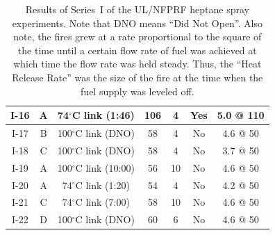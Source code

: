 \begin{table}[h!]
\begin{center}
\begin{tabular}{|c||c|c|c|c|c|c|}
I-16  & A  & 74$^\circ$C link (1:46)    & 106           & 4         & Yes  & 5.0 @ 110 \\ \hline \hline
I-17  & B  & 100$^\circ$C link (DNO)    & 58            & 4         & No   & 4.6 @ 50 \\ \hline
I-18  & C  & 100$^\circ$C link (DNO)    & 58            & 4         & No   & 3.7 @ 50 \\ \hline
I-19  & A  & 100$^\circ$C link (10:00)  & 56            & 10        & No   & 4.6 @ 50 \\ \hline
I-20  & A  & 74$^\circ$C link (1:20)    & 54            & 4         & No   & 4.2 @ 50 \\ \hline
I-21  & C  & 74$^\circ$C link (7:00)    & 58            & 10        & No   & 4.6 @ 50 \\ \hline
I-22  & D  & 100$^\circ$C link (DNO)    & 60            & 6         & No   & 4.6 @ 50 \\ \hline
\end{tabular}
\end{center}
\caption[Results of the UL/NFPRF heptane spray experiments, Series~I]
{Results of Series~I of the UL/NFPRF heptane spray experiments. Note that DNO means ``Did Not Open''. Also note, the fires grew at a rate proportional to the square of the time until a certain flow rate of fuel was achieved at which time the flow rate was held steady. Thus, the ``Heat Release Rate'' was the size of the fire at the time when the fuel supply was leveled off.}
\label{ULmatrix}
\end{table}

